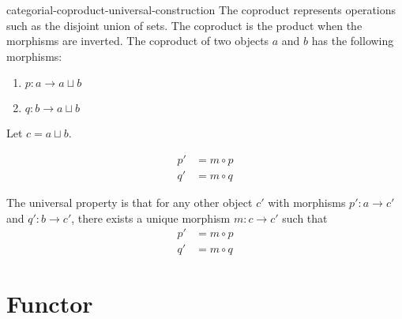 \documentclass[preview]{standalone}
\begin{document}
\begin{snippet}{categorial-coproduct-universal-construction}
The coproduct represents operations
such as the disjoint union of sets.
The coproduct is the product when the morphisms are inverted.
The coproduct of two objects \(a\) and \(b\) has the following
morphisms:
\begin{enumerate}
    \item \(p \colon a \to a\sqcup b\)
    \item \(q \colon b \to a\sqcup b\)
\end{enumerate}

Let \(c=a\sqcup b\).

\begin{minipage}{0.5\textwidth}
\end{minipage}
\begin{minipage}{0.5\textwidth}
    \begin{align*}
        p' &= m \circ p \\
        q' &= m \circ q
    \end{align*}
\end{minipage}

The universal property is that for any other object \(c'\)
with morphisms \(p' \colon a \to c'\) and \(q' \colon b \to c'\),
there exists a unique morphism \(m \colon c \to c'\)
such that
\begin{align*}
    p' &= m \circ p \\
    q' &= m \circ q
\end{align*}
\end{snippet}

\section{Functor}

\end{document}
